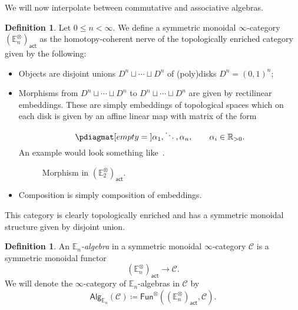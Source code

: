 \documentclass[10pt, oneside]{memoir}
\theoremstyle{definition}
\newtheorem{defn}[thm]{Definition}
\theoremstyle{remark}
\theoremstyle{plain}
\theoremstyle{definition}
\theoremstyle{remark}
\newcommand{\R}{\mathbb{R}}
\newcommand{\E}{\mathbb{E}}
\newcommand{\mc}[1]{\mathcal{#1}}
\newcommand{\ms}[1]{\mathsf{#1}}
\newcommand{\1}{\mathbf{1}}
\newcommand{\2}{\mathbf{2}}
\newcommand{\3}{\mathbf{3}}
\begin{document}
We will now interpolate between commutative and associative algebras.
\begin{defn}
    Let $0 \leq n < \infty$. We define a symmetric monoidal $\infty$-category $(\E_n^{\otimes})_{\ms{act}}$ as the homotopy-coherent nerve of the topologically enriched category given by the following:
    \begin{itemize}
        \item Objects are disjoint unions $D^n \sqcup \cdots \sqcup D^n$ of (poly)disks $D^n = (0,1)^n$;
        \item Morphisms from $D^n \sqcup \cdots \sqcup D^n$ to $D^n \sqcup \cdots \sqcup D^n$ are given by rectilinear embeddings. These are simply embeddings of topological spaces which on each disk is given by an affine linear map with matrix of the form
        \[ \pdiagmat[empty={}]{\alpha_1,\ddots,\alpha_n}, \qquad \alpha_i \in \R_{>0}. \]
        An example would look something like~.
        \begin{figure}[htpb]
        \begin{center}
        \end{center}
        \caption{Morphism in $(\E_2^{\otimes})_{\ms{act}}$.}%
        \label{fig:E2operad}
        \end{figure}
        \item Composition is simply composition of embeddings.
    \end{itemize}
    This category is clearly topologically enriched and has a symmetric monoidal structure given by disjoint union.
\end{defn}

\begin{defn}
    An \textit{$\E_n$-algebra} in a symmetric monoidal $\infty$-category $\mc{C}$ is a symmetric monoidal functor
    \[ (\E_n^{\otimes})_{\ms{act}} \to \mc{C}. \]
    We will denote the $\infty$-category of $\E_n$-algebras in $\mc{C}$ by
    \[ \ms{Alg}_{\E_n}(\mc{C}) \coloneqq \ms{Fun}^{\otimes} ((\E_n^{\otimes})_{\ms{act}}, \mc{C}). \]
\end{defn}
\end{document}
